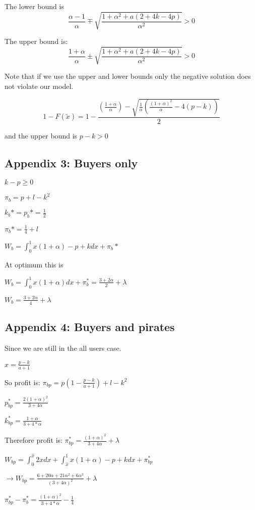 \documentclass{article}
\begin{document}
The lower bound is 
\[
\frac{\alpha-1}{\alpha}\mp\sqrt{\frac{1+\alpha^2+a(2+4k-4p)}{\alpha^2}}>0
\]

The upper bound is:
\[
\frac{1+\alpha}{\alpha}\pm \sqrt{\frac{1+\alpha^2+a(2+4k-4p)}{\alpha^2}}>0
\]

Note that if we use the upper and lower bounds only the negative solution does not violate our model. 

\[
1-F(\tilde{x}) = 1-\frac{(\frac{1+\alpha}{\alpha}) - \sqrt{\frac{1}{\alpha}(\frac{(1+\alpha)^2}{\alpha}-4(p-k))}} {2}
\]  

and the upper bound is $p-k>0$

\subsection{Appendix 3: Buyers only}

$k-p \geq  0$

$\pi_b = p+l-k^2$

$k_b*=p_b*=\frac{1}{2}$

$\pi_b* = \frac{1}{4}+l$

$W_b= \int_0^1x(1+\alpha) -p+k dx +\pi_b* $

At optimum this is

$W_b= \int_0^1x(1+\alpha) dx +\pi_b^*= \frac{3+ 2\alpha }{2} + \lambda $

$W_b= \frac{3+2 \alpha}{4}+ \lambda$

\subsection{Appendix 4: Buyers and pirates}

Since we are still in the all users case. 

$\hat{x} = \frac{p-k}{a+1}$

So profit is:
$\pi_{bp} = p(1-\frac{p-k}{a+1})+l-k^2$

$p_{bp}^* = \frac{2(1+ \alpha )^2}{3+ 4 \alpha}$

$k_{bp}^* = \frac{1+ \alpha }{3 + 4*\alpha}$

Therefore profit is: 
$\pi_{bp}^* = \frac{(1+ \alpha)^2 }{3 + 4\alpha} + \lambda $

$W_{bp}= \int^{\hat{x}}_0 2x dx +\int^{1}_{\hat{x}} x(1+\alpha) -p +k dx + \pi_{bp}^* $

$\rightarrow W_{bp}= \frac{6+20 \alpha+21\alpha^2 + 6 \alpha^3}{(3+4\alpha)^2} + \lambda$

$\pi_{bp}^* -\pi_b^* = \frac{(1+ \alpha)^2 }{3 + 4*\alpha}-\frac{1}{4}$
\end{document}

